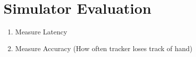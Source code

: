 \section{Simulator Evaluation}
\begin{enumerate}
	\item Measure Latency
	\item Measure Accuracy (How often tracker loses track of hand)
\end{enumerate}